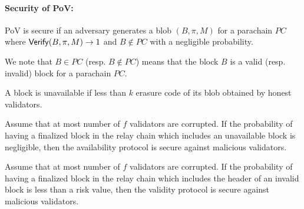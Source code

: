 \paragraph{Security of PoV:} PoV is secure if an adversary generates a blob $(B,\pi,M)$ for a parachain $PC$ where  $\mathsf{Verify}(B,\pi,M) \rightarrow 1$ and $B \notin PC$ with a negligible probability.


We note that $B\in PC$ (resp. $B \notin PC$) means that the block $B$ is a valid (resp. invalid) block for a parachain $PC$.


\begin{definition}\label{def:unavail}
A block is unavailable if less than $k$ erasure code of its blob obtained by honest validators.
\end{definition}


\begin{definition}
Assume that  at most number of $f$ validators are corrupted. If the probability of having a finalized block in the relay chain which includes an unavailable block is negligible, then the availability protocol is secure against malicious validators.
\end{definition}

\begin{definition}
Assume that  at most number of $f$ validators are corrupted. If the probability of having a finalized block in the relay chain which includes the header of an invalid block is less than a risk value, then the validity protocol is secure against malicious validators.
\end{definition}






